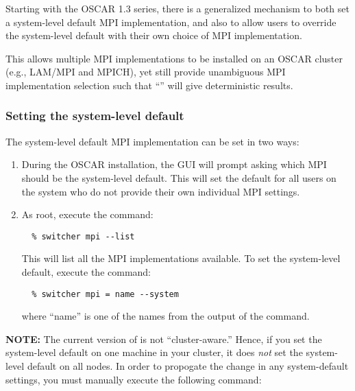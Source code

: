 %
%
%

Starting with the OSCAR 1.3 series, there is a generalized mechanism
to both set a system-level default MPI implementation, and also to
allow users to override the system-level default with their own choice
of MPI implementation.

This allows multiple MPI implementations to be installed on an OSCAR
cluster (e.g., LAM/MPI and MPICH), yet still provide unambiguous MPI
implementation selection such that ``'' will
give deterministic results.

\subsubsection{Setting the system-level default}

The system-level default MPI implementation can be set in two ways:

\begin{enumerate}
\item During the OSCAR installation, the GUI will prompt asking which
  MPI should be the system-level default.  This will set the default
  for all users on the system who do not provide their own individual
  MPI settings.

\item As root, execute the command:

\begin{verbatim}
  % switcher mpi --list
\end{verbatim}

   This will list all the MPI implementations available.  To set the
   system-level default, execute the command:

\begin{verbatim}
  % switcher mpi = name --system
\end{verbatim}
   
   where ``name'' is one of the names from the output of the
    command.
\end{enumerate}

{\bf NOTE:} The current version of  is not
``cluster-aware.''  Hence, if you set the system-level default on one
machine in your cluster, it does {\em not} set the system-level
default on all nodes.  In order to propogate the change in any
 system-default settings, you must manually execute the
following command:


